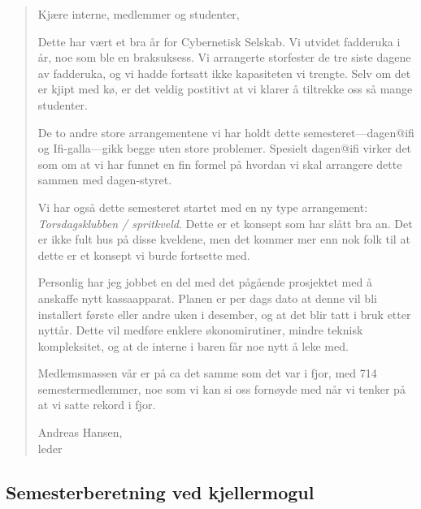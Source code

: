 \documentclass[10pt,norsk,a4paper]{article}
\begin{document}
\begin{quote}
	Kjære interne, medlemmer og studenter,

Dette har vært et bra år for Cybernetisk Selskab. Vi utvidet fadderuka i år, noe som ble en braksuksess. Vi arrangerte storfester de tre siste dagene av fadderuka, og vi hadde fortsatt ikke kapasiteten vi trengte. Selv om det er kjipt med kø, er det veldig postitivt at vi klarer å tiltrekke oss så mange studenter.

De to andre store arrangementene vi har holdt dette semesteret---dagen@ifi og Ifi-galla---gikk begge uten store problemer. Spesielt dagen@ifi virker det som om at vi har funnet en fin formel på hvordan vi skal arrangere dette sammen med dagen-styret.

Vi har også dette semesteret startet med en ny type arrangement: \textit{Torsdagsklubben / spritkveld}. Dette er et konsept som har slått bra an. Det er ikke fult hus på disse kveldene, men det kommer mer enn nok folk til at dette er et konsept vi burde fortsette med.

Personlig har jeg jobbet en del med det pågående prosjektet med å anskaffe nytt kassaapparat. Planen er per dags dato at denne vil bli installert første eller andre uken i desember, og at det blir tatt i bruk etter nyttår. Dette vil medføre enklere økonomirutiner, mindre teknisk kompleksitet, og at de interne i baren får noe nytt å leke med.

Medlemsmassen vår er på ca det samme som det var i fjor, med 714 semestermedlemmer, noe som vi kan si oss fornøyde med når vi tenker på at vi satte rekord i fjor.

Andreas Hansen,\\
leder
\end{quote}



\subsection{Semesterberetning ved kjellermogul}
\end{document}
